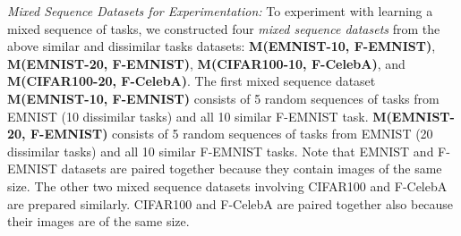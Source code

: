 \documentclass{article}
\begin{document}
\textit{Mixed Sequence Datasets for Experimentation:} To experiment with learning a mixed sequence of tasks, we constructed four \textit{mixed sequence datasets} from the above similar and dissimilar tasks datasets: 
\textbf{M(EMNIST-10, F-EMNIST)},
\textbf{M(EMNIST-20, F-EMNIST)},
\textbf{M(CIFAR100-10, F-CelebA)}, and
\textbf{M(CIFAR100-20, F-CelebA)}. The first mixed sequence dataset \textbf{M(EMNIST-10, F-EMNIST)} consists of 5 random sequences of tasks from EMNIST (10 dissimilar tasks) and all 10 similar F-EMNIST task. \textbf{M(EMNIST-20, F-EMNIST)} consists of 5 random sequences of tasks from EMNIST (20 dissimilar tasks) and all 10 similar F-EMNIST tasks. Note that EMNIST and F-EMNIST datasets are paired together because they contain images of the same size. The other two mixed sequence datasets involving CIFAR100 and F-CelebA are prepared similarly. CIFAR100 and F-CelebA are paired together also because their images are of the same size. 


\begin{table}[]
\centering
{}
\vspace{+2mm}
\caption{Statistics of the datasets, which contain the total number of classes and the total numbers of training, validation and testing instances for each dataset.}
\label{tab:dataset}
\vspace{-4mm}
\end{table}
\end{document}
